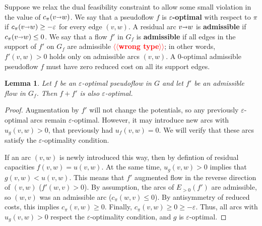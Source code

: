 \documentclass[11pt]{article}
\makeatletter
\def\eps{\varepsilon}
\def\arcto{\mathord\shortrightarrow}
\def\arc#1#2{#1\arcto#2}
\theoremstyle{plain}
\newtheorem{lemma}{Lemma}[section]
\numberwithin{figure}{section}
\def\EMPH#1{\textbf{\boldmath #1}}
\def\n@te#1{\textsf{\boldmath \textbf{$\langle\!\langle$#1$\rangle\!\rangle$}}\leavevmode}
\def\note#1{\textcolor{red}{\n@te{#1}}}
\makeatother
\begin{document}
Suppose we relax the dual feasibility constraint to allow some small violation in the value of $c_\pi(\arc vw)$.
We say that a pseudoflow $f$ is \EMPH{$\eps$-optimal} with respect to $\pi$ if
$c_\pi(\arc vw) \geq -\eps$ for every edge $(v, w)$.
A residual arc $\arc vw$ is
\EMPH{admissible} if $c_\pi(\arc vw) \leq 0$.
We say that a flow $f'$ in $G_f$ is \EMPH{admissible} if all edges in the support of $f'$ on $G_f$ are admissible \note{wrong type}; in other words, $f'(v, w) > 0$ holds
only on admissible arcs $(v, w)$.
%
A $0$-optimal admissible pseudoflow $f$ must have zero reduced cost on all its support edges.


\begin{lemma}
Let $f$ be an $\eps$-optimal pseudoflow in $G$ and let $f'$ be an
admissible flow in $G_f$.
Then $f + f'$ is also $\eps$-optimal.
\end{lemma}
\begin{proof}
Augmentation by $f'$ will not change the potentials, so any previously
$\eps$-optimal arcs remain $\eps$-optimal.
However, it may introduce new arcs with $u_g(v, w) > 0$, that previously had
$u_f(v, w) = 0$.
We will verify that these arcs satisfy the $\eps$-optimality condition.

If an arc $(v, w)$ is newly introduced this way, then by defintion of residual
capacities $f(v, w) = u(v, w)$.
At the same time, $u_g(v, w) > 0$ implies that $g(v, w) < u(v, w)$.
This means that $f'$ augmented flow in the reverse direction of $(v, w)$
($f'(w, v) > 0$).
By assumption, the arcs of $E_{>0}(f')$ are admissible, so $(w, v)$ was an
admissible arc ($c_\pi(w, v) \leq 0$).
By antisymmetry of reduced costs, this implies $c_\pi(v, w) \geq 0$.
Finally, $c_\pi(v, w) \geq 0 \geq -\eps$.
Thus, all arcs with $u_g(v, w) > 0$ respect the $\eps$-optimality condition,
and $g$ is $\eps$-optimal.
\end{proof}


\end{document}
